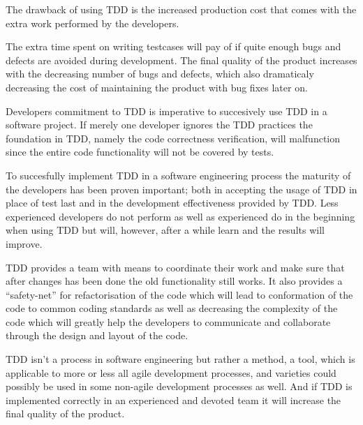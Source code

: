 The drawback of using TDD is the increased production cost that comes with the extra work performed by the developers.

The extra time spent on writing testcases will pay of if quite enough bugs and defects are avoided during development. The final quality of the product increases with the decreasing number of bugs and defects, which also dramaticaly decreasing the cost of maintaining the product with bug fixes later on.

Developers commitment to TDD is imperative to succesively use TDD in a software project. If merely one developer ignores the TDD practices the foundation in TDD, namely the code correctness verification, will malfunction since the entire code functionality will not be covered by tests.

To succesfully implement TDD in a software engineering process the maturity of the developers has been proven important; both in accepting the usage of TDD in place of test last and in the development effectiveness provided by TDD.
Less experienced developers do not perform as well as experienced do in the beginning when using TDD but will, however, after a while learn and the results will improve.

TDD provides a team with means to coordinate their work and make sure that after changes has been done the old functionality still works. It also provides a ``safety-net'' for refactorisation of the code which will lead to conformation of the code to common coding standards as well as decreasing the complexity of the code which will  greatly help the developers to communicate and collaborate through the design and layout of the code.

TDD isn't a process in software engineering but rather a method, a tool, which is applicable to more or less all agile development processes, and varieties could possibly be used in some non-agile development processes as well. And if TDD is implemented correctly in an experienced and devoted team it will increase the final quality of the product.